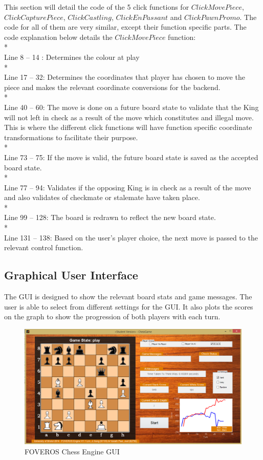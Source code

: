 \documentclass[11pt,a4paper]{article}
\begin{document}
This section will detail the code of the 5 click functions for $ClickMovePiece$, $ClickCapturePiece$, $ClickCastling$, $ClickEnPassant$ and $ClickPawnPromo$. The code for all of them are very similar, except their function specific parts. The code explanation below details the $ClickMovePiece$ function:
\\*\\
Line 8 – 14 : Determines the colour at play
\\*\\
Line 17 – 32: Determines the coordinates that player has chosen to move the piece and makes the relevant coordinate conversions for the backend.
\\*\\
Line 40 – 60: The move is done on a future board state to validate that the King will not left in check as a result of the move which constitutes and illegal move. This is where the different click functions will have function specific coordinate transformations to facilitate their purpose.
\\*\\
Line 73 – 75: If the move is valid, the future board state is saved as the accepted board state.
\\*\\
Line 77 – 94: Validates if the opposing King is in check as a result of the move and also validates of checkmate or stalemate have taken place.
\\*\\
Line 99 – 128: The board is redrawn to reflect the new board state.
\\*\\
Line 131 – 138: Based on the user’s player choice, the next move is passed to the relevant control function.


\subsection{Graphical User Interface}
The GUI is designed to show the relevant board stats and game messages. The user is able to select from different settings for the GUI. It also plots the scores on the graph to show the progression of both players with each turn.
\begin{figure}[H]
\centering
\includegraphics[width=1\textwidth]{GUI}
\caption{FOVEROS Chess Engine GUI}
\label{fig:chess1}
\end{figure}
\end{document}
